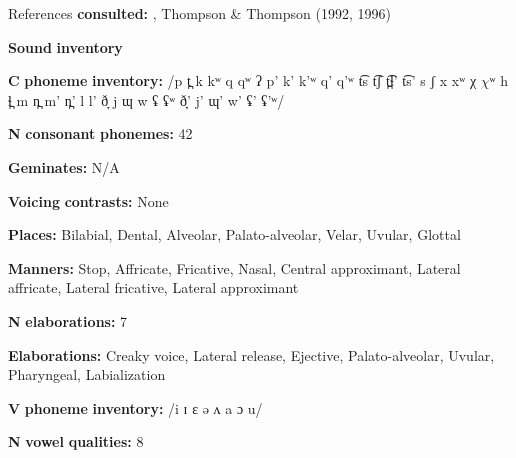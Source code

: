 \documentclass[output=paper]{langsci/langscibook}
\begin{document}
\begin{styleBody}
References \textbf{consulted:} \citet{Koch2008}, Thompson \& Thompson (1992, 1996)
\end{styleBody}

\begin{styleBody}
\textbf{Sound} \textbf{inventory}
\end{styleBody}

\begin{styleBody}
\textbf{C} \textbf{phoneme} \textbf{inventory:} /p t̪ k kʷ q qʷ ʔ p’ k’ k’ʷ q’ q’ʷ t͡s t͡ʃ t̪͡ɬ’ t͡s’ s ʃ x xʷ χ $\chi ʷ$ h ɬ̪ m n̪ m’ n̪’ l l’ ð̞ j ɰ w ʢ ʢʷ ð̞’ j’ ɰ’ w’ ʢ’ ʢ’ʷ/
\end{styleBody}

\begin{styleBody}
\textbf{N} \textbf{consonant} \textbf{phonemes:} 42
\end{styleBody}

\begin{styleBody}
\textbf{Geminates:} N/A
\end{styleBody}

\begin{styleBody}
\textbf{Voicing} \textbf{contrasts:} None
\end{styleBody}

\begin{styleBody}
\textbf{Places:} Bilabial, Dental, Alveolar, Palato-alveolar, Velar, Uvular, Glottal 
\end{styleBody}

\begin{styleBody}
\textbf{Manners:} Stop, Affricate, Fricative, Nasal, Central approximant, Lateral affricate, Lateral fricative, Lateral approximant
\end{styleBody}

\begin{styleBody}
\textbf{N} \textbf{elaborations:} 7
\end{styleBody}

\begin{styleBody}
\textbf{Elaborations:} Creaky voice, Lateral release, Ejective, Palato-alveolar, Uvular, Pharyngeal, Labialization
\end{styleBody}

\begin{styleBody}
\textbf{V} \textbf{phoneme} \textbf{inventory:} /i ɪ ɛ ə ʌ a ɔ u/
\end{styleBody}

\begin{styleBody}
\textbf{N} \textbf{vowel} \textbf{qualities:} 8
\end{styleBody}
\end{document}

